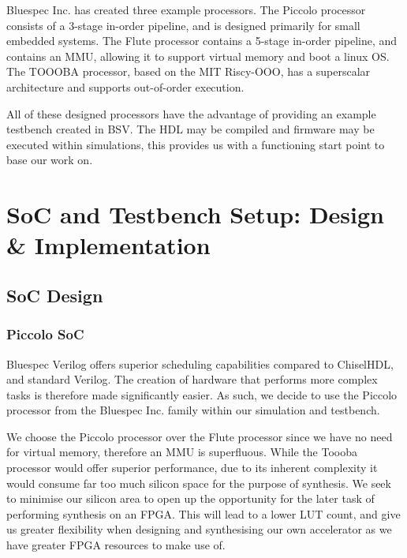\documentclass[a4paper,8pt]{report}
\begin{document}
Bluespec Inc. has created three example processors. The Piccolo processor
consists of a 3-stage in-order pipeline, and is designed primarily for small
embedded systems. The Flute processor contains a 5-stage in-order pipeline, and
contains an MMU, allowing it to support virtual memory and boot a linux OS.
The TOOOBA processor, based on the MIT Riscy-OOO\cite{riscy-ooo}, has a superscalar architecture
and supports out-of-order execution.

All of these designed processors have the advantage of providing an example
testbench created in BSV. The HDL may be compiled and firmware may be executed
within simulations, this provides us with a functioning start point to base our
work on.




\chapter{SoC and Testbench Setup: Design \& Implementation}

\section{SoC Design}
\subsection{Piccolo SoC}
Bluespec Verilog offers superior scheduling capabilities compared to ChiselHDL,
and standard Verilog. The creation of hardware that performs more complex tasks
is therefore made significantly easier. As such, we decide to use the Piccolo
processor from the Bluespec Inc. family within our simulation and testbench.

We choose the Piccolo\cite{piccolo} processor over the Flute\cite{flute} processor since we have no need
for virtual memory, therefore an MMU is superfluous. While the Toooba\cite{toooba} processor
would offer superior performance, due to its inherent complexity it would
consume far too much silicon space for the purpose of synthesis. We seek to
minimise our silicon area to open up the opportunity for the later task of
performing synthesis on an FPGA. This will lead to a lower LUT count, and give
us greater flexibility when designing and synthesising our own accelerator as we
have greater FPGA resources to make use of.
\end{document}
